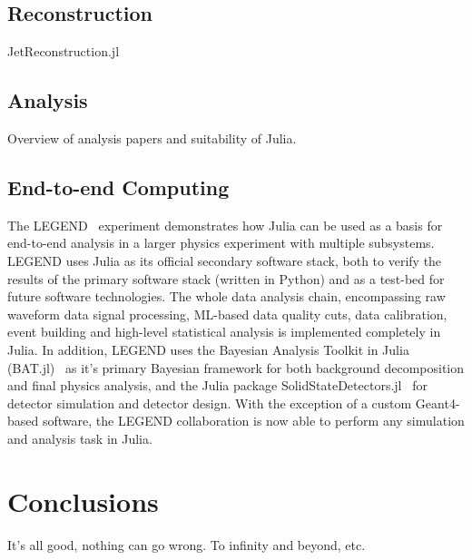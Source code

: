 \documentclass{webofc}
\begin{document}
\subsection{Reconstruction}

JetReconstruction.jl

\subsection{Analysis}

Overview of analysis papers and suitability of Julia.

\subsection{End-to-end Computing}

The LEGEND~\cite{LEGEND:2017AIPC} experiment demonstrates how Julia can be used as a basis for end-to-end analysis in a larger physics experiment with multiple subsystems. LEGEND uses Julia as its official secondary software stack, both to verify the results of the primary software stack (written in Python) and as a test-bed for future software technologies. The whole data analysis chain, encompassing raw waveform data signal processing, ML-based data quality cuts, data calibration, event building and high-level statistical analysis is implemented completely in Julia. In addition, LEGEND uses the Bayesian Analysis Toolkit in Julia (BAT.jl)~\cite{Schulz:2021BAT} as it's primary Bayesian framework for both background decomposition and final physics analysis, and the Julia package SolidStateDetectors.jl~\cite{Abt:2021SSD} for detector simulation and detector design. With the exception of a custom Geant4-based software, the LEGEND collaboration is now able to perform any simulation and analysis task in Julia.


\section{Conclusions}

It's all good, nothing can go wrong. To infinity and beyond, etc.

\sloppy
\raggedright

\end{document}
